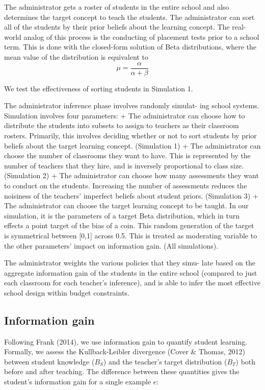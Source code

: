 \documentclass[10pt, letterpaper]{article}
\begin{document}
The administrator gets a roster of students in the entire school and
also determines the target concept to teach the students. The
administrator can sort all of the students by their prior beliefs about
the learning concept. The real-world analog of this process is the
conducting of placement tests prior to a school term. This is done with
the closed-form solution of Beta distributions, where the mean value of
the distribution is equivalent to
\[\mu = \frac{\alpha}{\alpha + \beta}\]

We test the effectiveness of sorting students in Simulation 1.

The administrator inference phase involves randomly simulat- ing school
systems. Simulation involves four parameters: + The administrator can
choose how to distribute the students into subsets to assign to teachers
as their classroom rosters. Primarily, this involves deciding whether or
not to sort students by prior beliefs about the target learning concept.
(Simulation 1) + The administrator can choose the number of classrooms
they want to have. This is represented by the number of teachers that
they hire, and is inversely proportional to class size. (Simulation 2) +
The administrator can choose how many assessments they want to conduct
on the students. Increasing the number of assessments reduces the
noisiness of the teachers' imperfect beliefs about student priors.
(Simulation 3) + The administrator can choose the target learning
concept to be taught. In our simulation, it is the parameters of a
target Beta distribution, which in turn effects a point target of the
bias of a coin. This random generation of the target is symmetrical
between {[}0,1{]} across 0.5. This is treated as moderating variable to
the other parameters' impact on information gain. (All simulations).

The administrator weights the various policies that they simu- late
based on the aggregate information gain of the students in the entire
school (compared to just each classroom for each teacher's inference),
and is able to infer the most effective school design within budget
constraints.

\subsection{Information gain}\label{information-gain}

Following Frank (2014), we use information gain to quantify student
learning. Formally, we assess the Kullback-Leibler divergence (Cover \&
Thomas, 2012) between student knowledge (\(B_S\)) and the teacher's
target distribution (\(B_T\)) both before and after teaching. The
difference between these quantities gives the student's information gain
for a single example \(e\):
\end{document}
